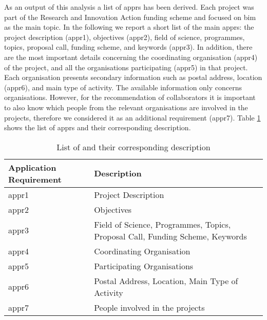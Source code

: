 As an output of this analysis a list of \glspl{appr} has been derived.
Each project was part of the Research and Innovation Action funding scheme and focused on \gls{bim} as the main topic.
In the following we report a short list of the main \glspl{appr}: the project description (\gls{appr}1), objectives (\gls{appr}2), field of science, programmes, topics, proposal call, funding scheme, and keywords (\gls{appr}3).
In addition, there are the most important details concerning the coordinating organisation (\gls{appr}4) of the project, and all the organisations participating (\gls{appr}5) in that project.
Each organisation presents secondary information such as postal address, location (\gls{appr}6), and main type of activity.
The available information only concerns organisations.
However, for the recommendation of collaborators it is important to also know which people from the relevant organisations are involved in the projects, therefore we considered it as an additional requirement (\gls{appr}7).
Table \ref{tab:application-requirements} shows the list of \glspl{appr} and their corresponding description.

\begin{table}[htbp]
    \centering
    \scriptsize
    \begin{tabularx}{\textwidth}{|>{\centering\arraybackslash}p{2cm}|X|}
      \hline
      \textbf{Application Requirement} & \textbf{Description}\\
        \hline
        \gls{appr}1 & Project Description \\
        \gls{appr}2 & Objectives \\
        \gls{appr}3 & Field of Science, Programmes, Topics, Proposal Call, Funding Scheme, Keywords \\
        \gls{appr}4 & Coordinating Organisation \\
        \gls{appr}5 & Participating Organisations \\
        \gls{appr}6 & Postal Address, Location, Main Type of Activity \\
        \gls{appr}7 & People involved in the projects \\
        \hline
    \end{tabularx}
    \caption{List of  and their corresponding description}
    \label{tab:application-requirements}
\end{table}
        